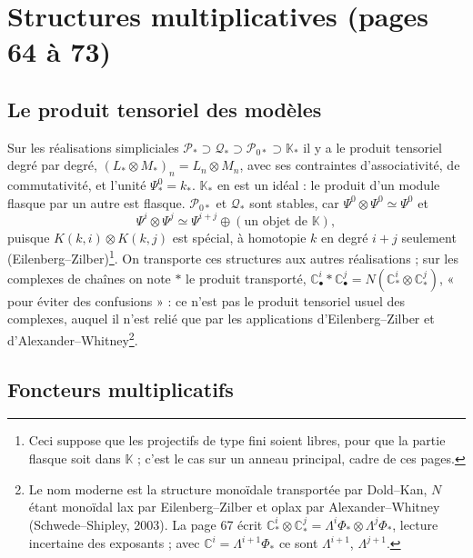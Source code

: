 \documentclass[11pt,a4paper]{article}
\begin{document}
\section*{Structures multiplicatives (pages 64 à 73)}

\subsection*{Le produit tensoriel des modèles}

Sur les réalisations simpliciales $\mathcal{P}_{*} \supset \mathcal{Q}_{*}
\supset \mathcal{P}_{0*} \supset \mathbb{K}_{*}$ il y a le produit
tensoriel degré par degré, $(L_{*} \otimes M_{*})_{n} = L_{n} \otimes
M_{n}$, avec ses contraintes d'associativité, de commutativité, et l'unité
$\Psi^{0}_{*} = k_{*}$. $\mathbb{K}_{*}$ en est un idéal : le produit d'un
module flasque par un autre est flasque. $\mathcal{P}_{0*}$ et
$\mathcal{Q}_{*}$ sont stables, car $\Psi^{0} \otimes \Psi^{0} \simeq
\Psi^{0}$ et
\[
  \Psi^{i} \otimes \Psi^{j} \simeq \Psi^{i+j} \oplus (\text{un objet de }
  \mathbb{K}) ,
\]
puisque $K(k,i) \otimes K(k,j)$ est spécial, à homotopie $k$ en degré $i+j$
seulement (Eilenberg–Zilber)\footnote{Ceci suppose que les projectifs de type
fini soient libres, pour que la partie flasque soit dans $\mathbb{K}$ ; c'est
le cas sur un anneau principal, cadre de ces pages.}. On transporte ces
structures aux autres réalisations ; sur les complexes de chaînes on note
$*$ le produit transporté, $\mathbb{C}^{i}_{\bullet} * \mathbb{C}^{j}_{\bullet}
= N(\mathbb{C}^{i}_{*} \otimes \mathbb{C}^{j}_{*})$, « pour éviter des
confusions » : ce n'est pas le produit tensoriel usuel des complexes, auquel
il n'est relié que par les applications d'Eilenberg–Zilber et
d'Alexander–Whitney\footnote{Le nom moderne est la structure monoïdale
transportée par Dold–Kan, $N$ étant monoïdal lax par Eilenberg–Zilber et
oplax par Alexander–Whitney (Schwede–Shipley, 2003). La page 67 écrit
$\mathbb{C}^{i}_{*} \otimes \mathbb{C}^{j}_{*} = \Lambda^{i}\Phi_{*} \otimes
\Lambda^{j}\Phi_{*}$, lecture incertaine des exposants ; avec
$\mathbb{C}^{i} = \Lambda^{i+1}\Phi_{*}$ ce sont $\Lambda^{i+1}$,
$\Lambda^{j+1}$.}.

\subsection*{Foncteurs multiplicatifs}
\end{document}
